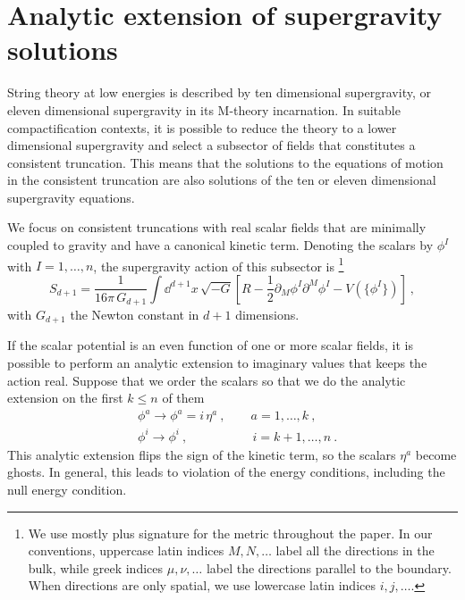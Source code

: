 \section{Analytic extension of supergravity solutions
}\label{sec:analyticext}

String theory at low energies is described by ten dimensional supergravity, or eleven dimensional supergravity in its M-theory incarnation. In suitable compactification contexts, it is possible to reduce the theory to a lower dimensional supergravity and select a subsector of fields that constitutes a consistent truncation.
This means that the solutions to the equations of motion in the consistent truncation are also solutions of the ten or eleven dimensional supergravity equations.

We focus on consistent truncations with real scalar fields that are minimally coupled to gravity and have a canonical kinetic term. Denoting the scalars by $\phi^I$ with $I=1,\dots,n$, the supergravity action of this subsector is%
\footnote{We use mostly plus signature for the metric throughout the paper. In our conventions, uppercase latin indices $M,N,\dots$ label all the directions in the bulk, while greek indices $\mu,\nu,\dots$ label the directions parallel to the boundary. When directions are only spatial, we use lowercase latin indices $i,j,\dots$.}
\begin{equation}
	S_{d+1}=\frac{1}{16\pi\, G_{d+1}}\int \dd^{d+1} x\, \sqrt{-G}\left[R-\frac{1}{2}\partial_M \phi^I\partial^M\phi^I-V\left(\{\phi^I\}\right)\right]\ ,
\end{equation}
with $G_{d+1}$ the Newton constant in $d+1$ dimensions. 

If the scalar potential is an even function of one or more scalar fields, it is possible to perform an analytic extension to imaginary values that keeps the action real. Suppose that we order the scalars so that we do the analytic extension on the first $k\leq n$ of them
\begin{equation}
\begin{split}
	&\phi^a\to \phi^a =i\, \eta^a
	\ , \qquad  
	a=1,\dots, k
	\ ,\\
	&\phi^i\to \phi^i
	\ ,\qquad\qquad\quad\,
	i=k+1,\dots,n\ .
\end{split}
\end{equation}
This analytic extension flips the sign of the kinetic term, so the scalars $\eta^a$ become ghosts. In general, this leads to violation of the energy conditions, including the null energy condition.


